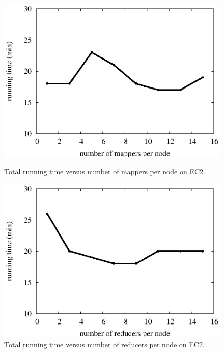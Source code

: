 \begin{figure}[htbp]
\hfill
\begin{minipage}[t]{0.45\linewidth}
\begin{center}
\centerline{\includegraphics[scale=0.35]{plots/amazon-mapper-scale.eps}}
\caption{Total running time versus number of mappers per node on EC2.}
\label{fig:amazon-mapper-scale}
\end{center}
\end{minipage}
\hfill
\begin{minipage}[t]{0.45\linewidth}
\begin{center}
\centerline{\includegraphics[scale=0.35]{plots/amazon-reducer-scale.eps}}
\caption{Total running time versus number of reducers per node on EC2.}
\label{fig:amazon-reducer-scale}
\end{center}
\end{minipage}
\hfill
\end{figure}

